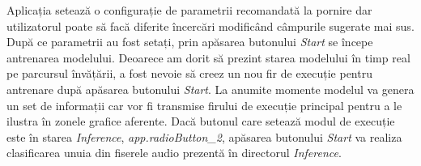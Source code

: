 \documentclass[a4paper,12pt]{book}
\begin{document}
		Aplicația setează o configurație de parametrii recomandată la pornire dar utilizatorul poate să facă diferite încercări modificând câmpurile sugerate mai sus. După ce parametrii au fost setați, prin apăsarea butonului \textit{Start} se începe antrenarea modelului. Deoarece am dorit să prezint starea modelului în timp real pe parcursul învățării, a fost nevoie să creez un nou fir de execuție pentru antrenare după apăsarea butonului \textit{Start}. La anumite momente modelul va genera un set de informații car vor fi transmise firului de execuție principal pentru a le ilustra în zonele grafice aferente. Dacă butonul care setează modul de execuție este în starea \textit{Inference}, \textit{app.radioButton\_2}, apăsarea butonului \textit{Start} va realiza clasificarea unuia din fiserele audio prezentă în directorul \textit{Inference}.
		
\end{document}
